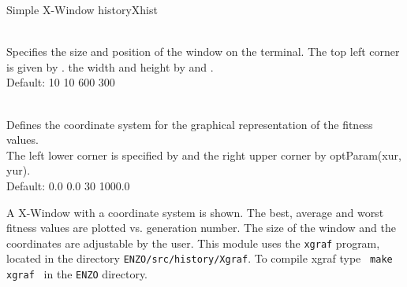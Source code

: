 \begin{moduledoc}{Simple X-Window history}{Xhist}

  \item[\KeyWord{Xgeometry}
        \optParam{x} \optParam{y} \optParam{width} \optParam{height} ]~\\
    Specifies the size and position of 	the window on the terminal.
    The top left corner is given by  . the width and height
by  and .\\
    Default: 10 10 600 300
  \item[\KeyWord{Xcoord}
        \optParam{xll} \optParam{yll} \optParam{xur} \optParam{yur} ]~\\
	Defines the coordinate system for the graphical representation
	of the fitness values.\\
	The left lower corner is specified by 
        and the right upper corner by optParam{(xur, yur)}.\\
    Default: 0.0 0.0 30 1000.0

\end{moduledoc}

A X-Window with a coordinate system is shown. The best, average and worst
fitness values are plotted vs. generation number. The size of the window
and the coordinates are adjustable by the user.
This module uses the \verb+xgraf+ program, located in the directory \verb+ENZO/src/history/Xgraf+. To compile xgraf type \verb+ make xgraf + in the \verb+ENZO+ directory.
